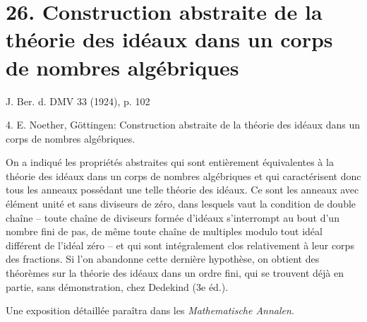 
\section*{26. Construction abstraite de la théorie des idéaux dans un corps de nombres algébriques}

\begin{center}
J. Ber. d. DMV 33 (1924), p. 102
\end{center}

4. E. Noether, Göttingen: Construction abstraite de la théorie des idéaux dans un corps de nombres algébriques.

On a indiqué les propriétés abstraites qui sont entièrement équivalentes à la théorie des idéaux dans un corps de nombres algébriques et qui caractérisent donc tous les anneaux possédant une telle théorie des idéaux. Ce sont les anneaux avec élément unité et sans diviseurs de zéro, dans lesquels vaut la condition de double chaîne -- toute chaîne de diviseurs formée d'idéaux s'interrompt au bout d'un nombre fini de pas, de même toute chaîne de multiples modulo tout idéal différent de l'idéal zéro -- et qui sont intégralement clos relativement à leur corps des fractions. Si l'on abandonne cette dernière hypothèse, on obtient des théorèmes sur la théorie des idéaux dans un ordre fini, qui se trouvent déjà en partie, sans démonstration, chez Dedekind (3e éd.).

Une exposition détaillée paraîtra dans les \emph{Mathematische Annalen}.
